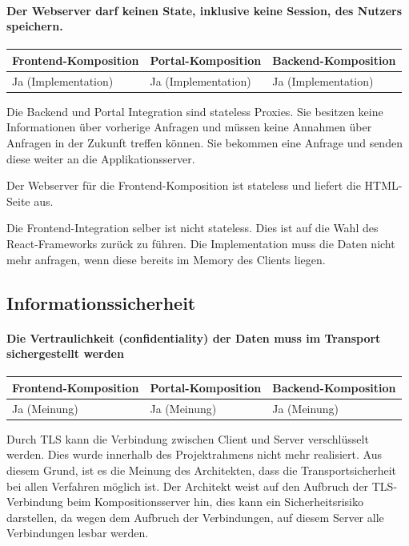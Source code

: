 \paragraph{Der Webserver darf keinen State, inklusive keine Session, des Nutzers speichern.}

\begin{tabularx}{\linewidth}{| Y | Y | Y |}
    \hline
    Frontend-Komposition & Portal-Komposition & Backend-Komposition
    \\ \hline
    Ja (Implementation) & Ja (Implementation) & Ja (Implementation) 
    \\ \hline
\end{tabularx}

Die Backend und Portal Integration sind stateless Proxies. Sie besitzen keine Informationen über vorherige Anfragen und müssen keine Annahmen über Anfragen in der Zukunft treffen können. Sie bekommen eine Anfrage und senden diese weiter an die Applikationsserver.

Der Webserver für die Frontend-Komposition ist stateless und liefert die HTML-Seite aus.

Die Frontend-Integration selber ist nicht stateless. Dies ist auf die Wahl des React-Frameworks zurück zu führen. Die Implementation muss die Daten nicht mehr anfragen, wenn diese bereits im Memory des Clients liegen. \cite{reactState}

\subsection{Informationssicherheit}

\paragraph{Die Vertraulichkeit (confidentiality) der Daten muss im Transport sichergestellt werden}

\begin{tabularx}{\linewidth}{| Y | Y | Y |}
    \hline
    Frontend-Komposition & Portal-Komposition & Backend-Komposition
    \\ \hline
    Ja (Meinung) & Ja (Meinung) & Ja (Meinung) 
    \\ \hline
\end{tabularx}

Durch \ac{TLS} kann die Verbindung zwischen Client und Server verschlüsselt werden. \cite{IetfTls} Dies wurde innerhalb des Projektrahmens nicht mehr realisiert. Aus diesem Grund, ist es die Meinung des Architekten, dass die Transportsicherheit bei allen Verfahren möglich ist. Der Architekt weist auf den Aufbruch der \ac{TLS}-Verbindung beim Kompositionsserver hin, dies kann ein Sicherheitsrisiko darstellen, da wegen dem Aufbruch der Verbindungen, auf diesem Server alle Verbindungen lesbar werden.

